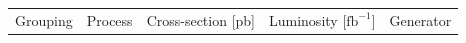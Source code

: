 \begin{table}[ht]
{    %
      \begin{tabular}{c|cccccc}
        \toprule
        Grouping                      & Process                                          & Cross-section [pb]                    & \multicolumn{3}{c}{Luminosity [$\mathrm{fb}^{-1}$]} & Generator \\

\end{tabular}}
\end{table}
